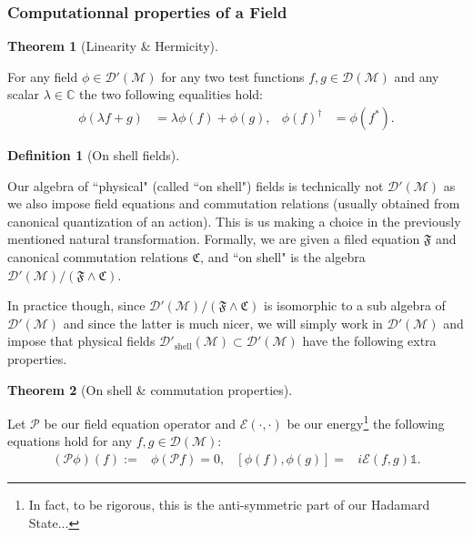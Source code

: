 \documentclass[a4paper,11pt]{article}
\numberwithin{equation}{section}
\theoremstyle{definition}
\newtheorem{definition}{Definition}
\newtheorem{theorem}{Theorem}
\begin{document}
\subsubsection{Computationnal properties of a Field}
        \begin{theorem}[Linearity \& Hermicity]$\quad$
        
         For any field $\phi\in\mathcal{D}'(\mathcal{M})$ for any two test functions $f,g\in\mathcal{D}(\mathcal{M})$ and any scalar $\lambda\in\mathbb{C}$  the two following equalities hold:
         \begin{align}
             \phi(\lambda f+ g) &= \lambda\phi(f)+ \phi(g),&
             \phi(f)^\dag &= \phi(f^*).
         \end{align}
        \end{theorem}
        \begin{definition}[On shell fields]$\quad$

        Our algebra of ``physical" (called ``on shell") fields is technically not $\mathcal{D}'(\mathcal{M})$ as we also impose field equations and commutation relations (usually obtained from canonical quantization of an action). This is us making a choice in the previously mentioned natural transformation. Formally, we are given a filed equation $\mathfrak{F}$ and canonical commutation relations $\mathfrak{C}$, and ``on shell" is the algebra $\mathcal{D}'(\mathcal{M})/(\mathfrak{F}\wedge\mathfrak{C})$.

        In practice though, since $\mathcal{D}'(\mathcal{M})/(\mathfrak{F}\wedge\mathfrak{C})$ is isomorphic to a sub algebra of $\mathcal{D}'(\mathcal{M})$ and since the latter is much nicer, we will simply work in $\mathcal{D}'(\mathcal{M})$ and impose that physical fields $\mathcal{D}'_\mathrm{shell}(\mathcal{M})\subset\mathcal{D}'(\mathcal{M})$ have the following extra properties.
        \end{definition}
        
        \begin{theorem}[On shell \& commutation properties]$\quad$
        
        Let $\mathcal{P}$ be our field equation operator and $\mathcal{E}(\cdot,\cdot)$ be our energy\footnote{In fact, to be rigorous, this is the anti-symmetric part of our Hadamard State...} the following equations hold for any $f,g\in\mathcal{D}(\mathcal{M})$:
        \begin{align}
            (\mathcal{P}\phi)(f):=&\phi(\mathcal{P}f)=0, &
            [\phi(f),\phi(g)]=&i\mathcal{E}(f,g)\mathds{1}.
        \end{align}            
        \end{theorem}
\end{document}
